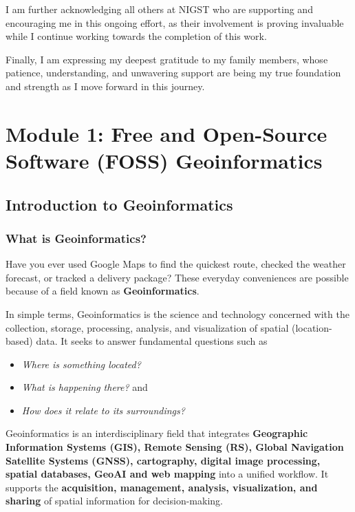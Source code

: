 \documentclass[
  11pt,
  letterpaper,
]{book}
\providecommand{\tightlist}{%
  \setlength{\itemsep}{0pt}\setlength{\parskip}{0pt}}
\begin{document}
I am further acknowledging all others at NIGST who are supporting and
encouraging me in this ongoing effort, as their involvement is proving
invaluable while I continue working towards the completion of this work.

Finally, I am expressing my deepest gratitude to my family members,
whose patience, understanding, and unwavering support are being my true
foundation and strength as I move forward in this journey.

\part{Module 1: Free and Open-Source Software (FOSS) Geoinformatics}

\chapter{Introduction to
Geoinformatics}\label{introduction-to-geoinformatics}

\section{What is Geoinformatics?}\label{what-is-geoinformatics}

Have you ever used Google Maps to find the quickest route, checked the
weather forecast, or tracked a delivery package? These everyday
conveniences are possible because of a field known as
\textbf{Geoinformatics}.

In simple terms, Geoinformatics is the science and technology concerned
with the collection, storage, processing, analysis, and visualization of
spatial (location-based) data. It seeks to answer fundamental questions
such as

\begin{itemize}
\tightlist
\item
  \emph{Where is something located?}
\item
  \emph{What is happening there?} and
\item
  \emph{How does it relate to its surroundings?}
\end{itemize}

Geoinformatics is an interdisciplinary field that integrates
\textbf{Geographic Information Systems (GIS), Remote Sensing (RS),
Global Navigation Satellite Systems (GNSS), cartography, digital image
processing, spatial databases, GeoAI and web mapping} into a unified
workflow. It supports the \textbf{acquisition, management, analysis,
visualization, and sharing} of spatial information for decision-making.
\end{document}
